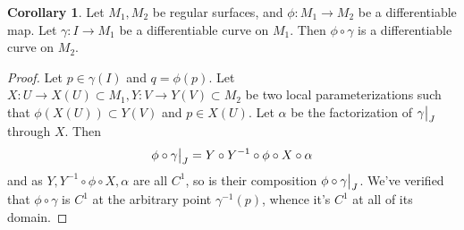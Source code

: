 \documentclass{article}
\newcommand\restr[2]{{%
  \left.\kern-\nulldelimiterspace %
  #1 %
  \vphantom{\big|} %
  \right|_{#2} %
  }}
\theoremstyle{definition}
\newtheorem{corollary}[theorem]{Corollary}
\begin{document}
\begin{corollary}
	Let $M_1, M_2$ be regular surfaces, and $\phi : M_1 \to M_2$ be a
	differentiable map. Let $\gamma : I \to M_1$ be a differentiable curve on
	$M_1$. Then $\phi \circ \gamma$ is a differentiable
	curve on $M_2$.
\end{corollary}
\begin{proof}
	Let $p \in \gamma(I)$ and $q = \phi(p)$. Let $X : U \to X(U) \subset M_1, Y
	: V \to Y(V) \subset M_2$ be two local parameterizations such that
	$\phi(X(U)) \subset Y(V)$ and $p \in X(U)$. Let $\alpha$ be the
	factorization of $\restr{\gamma}{J}$ through $X$. Then
	\[
		\phi \circ \restr{\gamma}{J}
		=
		Y
		\circ
		Y^{-1}
		\circ
		\phi
		\circ
		X
		\circ
		\alpha
	\] 
	and as $Y, Y^{-1} \circ \phi \circ X, \alpha$ are all $C^1$, so is their
	composition $\phi \circ \restr{\gamma}{J}$. We've verified that $\phi \circ
	\gamma$ is $C^1$ at the arbitrary point $\gamma^{-1}(p)$, whence it's $C^1$
	at all of its domain.
\end{proof}
\end{document}
